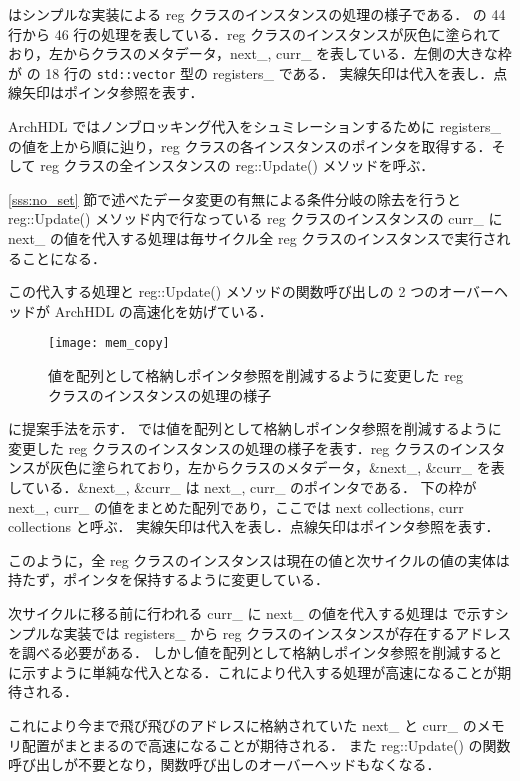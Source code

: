  はシンプルな実装による reg クラスのインスタンスの処理の様子である．
の 44 行から 46 行の処理を表している．reg クラスのインスタンスが灰色に塗られており，左からクラスのメタデータ，next\_, curr\_
を表している．左側の大きな枠が の 18 行の \verb`std::vector` 型の registers\_ である．
実線矢印は代入を表し．点線矢印はポインタ参照を表す．

ArchHDL ではノンブロッキング代入をシュミレーションするために registers\_ の値を上から順に辿り，reg クラスの各インスタンスのポインタを取得する．そして reg クラスの全インスタンスの reg::Update() メソッドを呼ぶ．

\ref{sss:no_set} 節で述べたデータ変更の有無による条件分岐の除去を行うと
reg::Update() メソッド内で行なっている reg
クラスのインスタンスの curr\_ に next\_ の値を代入する処理は毎サイクル全
reg クラスのインスタンスで実行されることになる．

この代入する処理と reg::Update() メソッドの関数呼び出しの 2
つのオーバーヘッドが ArchHDL の高速化を妨げている．

\begin{figure}[t]
 \centering
 \texttt{[image: mem\_copy]}
 \caption{値を配列として格納しポインタ参照を削減するように変更した reg クラスのインスタンスの処理の様子}
 \label{fig:mem_copy}
\end{figure}

 に提案手法を示す． では値を配列として格納しポインタ参照を削減するように変更した reg クラスのインスタンスの処理の様子を表す．reg クラスのインスタンスが灰色に塗られており，左からクラスのメタデータ，\&next\_, \&curr\_ を表している．\&next\_, \&curr\_ は next\_, curr\_ のポインタである．
下の枠が next\_, curr\_ の値をまとめた配列であり，ここでは next collections, curr collections と呼ぶ．
実線矢印は代入を表し．点線矢印はポインタ参照を表す．

このように，全 reg クラスのインスタンスは現在の値と次サイクルの値の実体は持たず，ポインタを保持するように変更している．

次サイクルに移る前に行われる curr\_ に next\_ の値を代入する処理は  で示すシンプルな実装では registers\_ から reg クラスのインスタンスが存在するアドレスを調べる必要がある．
しかし値を配列として格納しポインタ参照を削減すると  に示すように単純な代入となる．これにより代入する処理が高速になることが期待される．

これにより今まで飛び飛びのアドレスに格納されていた next\_ と curr\_ のメモリ配置がまとまるので高速になることが期待される．
また reg::Update() の関数呼び出しが不要となり，関数呼び出しのオーバーヘッドもなくなる．

